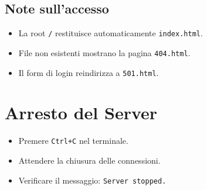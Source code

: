 \documentclass[a4paper,12pt]{report}
\begin{document}
\subsection{Note sull'accesso}

\begin{itemize}
    \item La root \texttt{/} restituisce automaticamente \texttt{index.html}.
    \item File non esistenti mostrano la pagina \texttt{404.html}.
    \item Il form di login reindirizza a \texttt{501.html}.
\end{itemize}

\section{Arresto del Server}

\begin{itemize}
    \item Premere \texttt{Ctrl+C} nel terminale.
    \item Attendere la chiusura delle connessioni.
    \item Verificare il messaggio: \texttt{Server stopped.}
\end{itemize}
\end{document}
